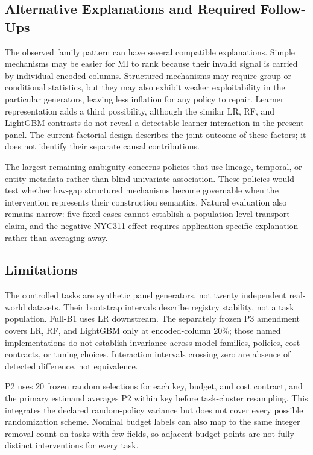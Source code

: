 \documentclass[sigconf,review]{acmart}
\begin{document}
\subsection{Alternative Explanations and Required Follow-Ups}

The observed family pattern can have several compatible explanations. Simple
mechanisms may be easier for MI to rank because their invalid signal is carried
by individual encoded columns. Structured mechanisms may require group or
conditional statistics, but they may also exhibit weaker exploitability in the
particular generators, leaving less inflation for any policy to repair.
Learner representation adds a third possibility, although the similar LR, RF,
and LightGBM contrasts do not reveal a detectable learner interaction in the
present panel. The current factorial design describes the joint outcome of
these factors; it does not identify their separate causal contributions.

The largest remaining ambiguity concerns policies that use lineage, temporal,
or entity metadata rather than blind univariate association. These policies
would test whether low-gap structured mechanisms become governable when the
intervention represents their construction semantics. Natural evaluation also
remains narrow: five fixed cases cannot establish a population-level transport
claim, and the negative NYC311 effect requires application-specific explanation
rather than averaging away.

\subsection{Limitations}

The controlled tasks are synthetic panel generators, not twenty independent
real-world datasets. Their bootstrap intervals describe registry stability,
not a task population. Full-B1 uses LR downstream. The separately frozen P3
amendment covers LR, RF, and LightGBM only at encoded-column 20\%; those named
implementations do not establish invariance across model families, policies,
cost contracts, or tuning choices. Interaction intervals crossing zero are
absence of detected difference, not equivalence.

P2 uses 20 frozen random selections for each key, budget, and cost contract, and the
primary estimand averages P2 within key before task-cluster resampling. This
integrates the declared random-policy variance but does not cover every possible
randomization scheme. Nominal budget labels can also map to the same integer
removal count on tasks with few fields,
so adjacent budget points are not fully distinct interventions for every task.
\end{document}
